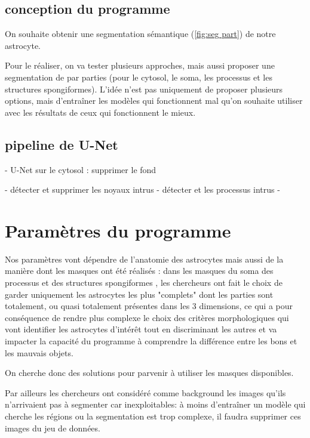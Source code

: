 \documentclass[7pt]{scrartcl}
\begin{document}
\subsection{conception du programme}

On souhaite obtenir une segmentation sémantique (\ref{fig:seg part}) de notre astrocyte. 

Pour le réaliser, on va tester plusieurs approches,  mais aussi proposer une segmentation de par parties (pour le cytosol, le soma, les processus et les structures spongiformes).
L'idée n'est pas uniquement de proposer plusieurs options, mais d'entraîner les modèles qui fonctionnent mal qu'on souhaite utiliser avec les résultats de ceux qui fonctionnent le mieux.


\subsection{pipeline de U-Net}

- U-Net sur le cytosol : supprimer le fond 


- détecter et supprimer les noyaux intrus 
- détecter et les processus intrus 
- 




\section{Paramètres du programme}
Nos paramètres vont dépendre de l'anatomie des astrocytes mais aussi de la manière dont les masques ont été réalisés : dans les masques du soma des processus et des structures spongiformes , les chercheurs ont fait le choix de garder uniquement les astrocytes les plus "complets" dont les parties sont totalement, ou quasi totalement présentes dans les 3 dimensions, ce qui a pour conséquence de rendre plus complexe le choix des critères morphologiques qui vont identifier les astrocytes d'intérêt tout en discriminant les autres et va impacter la capacité du programme à comprendre la différence entre les bons et les mauvais objets.

On cherche donc des solutions pour parvenir à utiliser les masques disponibles. 

Par ailleurs les chercheurs ont considéré comme background les images qu'ils n'arrivaient pas à segmenter car inexploitables: à moins d'entraîner un modèle qui cherche les régions ou la segmentation est trop complexe, il faudra supprimer ces images du jeu de données.
\end{document}
